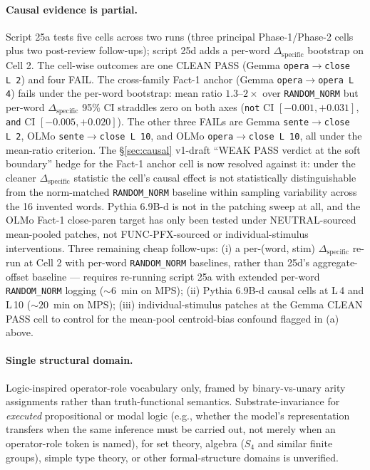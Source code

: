 \documentclass[11pt,letterpaper]{article}
\newcommand{\dspec}{\ensuremath{\Delta_{\text{specific}}}}
\begin{document}
\paragraph{Causal evidence is partial.} Script 25a tests five cells
across two runs (three principal Phase-1/Phase-2 cells plus two
post-review follow-ups); script 25d adds a per-word \dspec{}
bootstrap on Cell 2. The cell-wise outcomes are one CLEAN PASS
(Gemma \texttt{opera$\to$close L\,2}) and four FAIL. The cross-family
Fact-1 anchor (Gemma \texttt{opera$\to$opera L\,4}) fails under the
per-word bootstrap: mean ratio $1.3$--$2\times$ over
\texttt{RANDOM\_NORM} but per-word \dspec{} 95\% CI straddles zero on
both axes (\texttt{not} CI $[-0.001, +0.031]$, \texttt{and} CI
$[-0.005, +0.020]$). The other three FAILs are Gemma
\texttt{sente$\to$close L\,2}, OLMo \texttt{sente$\to$close L\,10},
and OLMo \texttt{opera$\to$close L\,10}, all under the mean-ratio
criterion. The \S\ref{sec:causal} v1-draft ``WEAK PASS verdict at
the soft boundary'' hedge for the Fact-1 anchor cell is now resolved
against it: under the cleaner \dspec{} statistic the cell's causal
effect is not statistically distinguishable from the norm-matched
\texttt{RANDOM\_NORM} baseline within sampling variability across
the 16 invented words. Pythia 6.9B-d is not in
the patching sweep at all, and the OLMo Fact-1 close-paren target
has only been tested under NEUTRAL-sourced mean-pooled patches, not
FUNC-PFX-sourced or individual-stimulus interventions. Three
remaining cheap follow-ups: (i) a per-(word, stim) \dspec{} re-run
at Cell 2 with per-word \texttt{RANDOM\_NORM} baselines, rather than
25d's aggregate-offset baseline --- requires re-running script 25a
with extended per-word \texttt{RANDOM\_NORM} logging (${\sim}6$~min
on MPS); (ii) Pythia 6.9B-d causal cells at L\,4 and L\,10
(${\sim}20$~min on MPS); (iii) individual-stimulus patches at the
Gemma CLEAN PASS cell to control for the mean-pool centroid-bias
confound flagged in (a) above.

\paragraph{Single structural domain.} Logic-inspired operator-role
vocabulary only, framed by binary-vs-unary arity assignments rather
than truth-functional semantics. Substrate-invariance for
\emph{executed} propositional or modal logic (e.g., whether the
model's representation transfers when the same inference must be
carried out, not merely when an operator-role token is named), for
set theory, algebra ($S_4$ and similar finite groups), simple type
theory, or other formal-structure domains is unverified.
\end{document}
